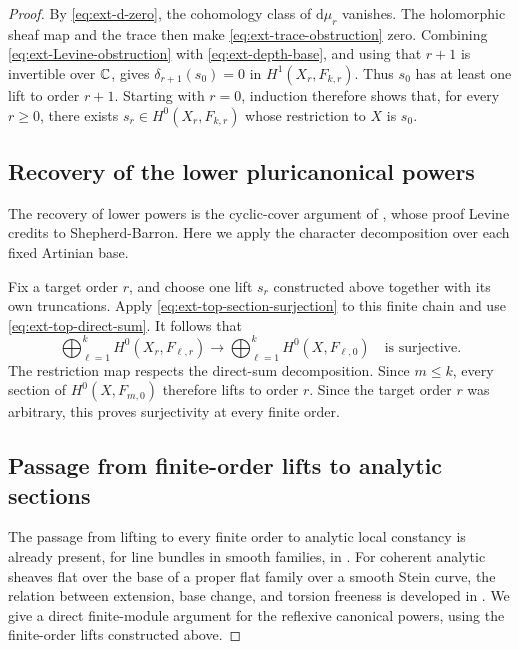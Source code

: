 \documentclass[11pt,a4paper]{article}
\theoremstyle{definition}\newtheorem{definition}[theorem]{Definition}
\theoremstyle{remark}\newtheorem*{remark}{Remark}
\newcommand{\dd}{\mathrm d}
\begin{document}
\begin{proof}
By \eqref{eq:ext-d-zero}, the cohomology class of $\dd\mu_r$ vanishes.
The holomorphic sheaf map and the trace then make
\eqref{eq:ext-trace-obstruction} zero.
Combining \eqref{eq:ext-Levine-obstruction} with
\eqref{eq:ext-depth-base}, and using that $r+1$ is invertible over $\mathbb C$,
gives
$\delta_{r+1}(s_0)=0$ in $H^1(X_r,F_{k,r})$.
Thus $s_0$ has at least one lift to order $r+1$.
Starting with $r=0$, induction therefore shows that, for every $r\ge0$,
there exists $s_r\in H^0(X_r,F_{k,r})$ whose restriction to $X$ is $s_0$.

\subsection{Recovery of the lower pluricanonical powers}

The recovery of lower powers is the cyclic-cover argument of
\cite[Corollary~1.8]{Levine1983}, whose proof Levine credits to
Shepherd-Barron. Here we apply the character decomposition over each
fixed Artinian base.

Fix a target order $r$, and choose one lift $s_r$ constructed above
together with its own truncations.
Apply \eqref{eq:ext-top-section-surjection} to this finite chain and
use \eqref{eq:ext-top-direct-sum}. It follows that
\[
 \bigoplus_{\ell=1}^{k}H^0(X_r,F_{\ell,r})
 \longrightarrow
 \bigoplus_{\ell=1}^{k}H^0(X,F_{\ell,0})
 \quad\text{is surjective}.
\]
The restriction map respects the direct-sum decomposition.
Since $m\le k$, every section of $H^0(X,F_{m,0})$ therefore lifts
to order $r$.
Since the target order $r$ was arbitrary, this proves surjectivity at
every finite order.

\subsection{Passage from finite-order lifts to analytic sections}

The passage from lifting to every finite order to analytic local
constancy is already present, for line bundles in smooth families,
in \cite[Lemma~1.1]{Levine1983}. For coherent analytic sheaves flat
over the base of a proper flat family over a smooth Stein curve,
the relation between extension, base change, and torsion freeness is
developed in \cite[Theorem~1.2 and Appendix~A]{FLR2026}.
We give a direct finite-module argument for the reflexive canonical
powers, using the finite-order lifts constructed above.


\end{proof}
\end{document}
